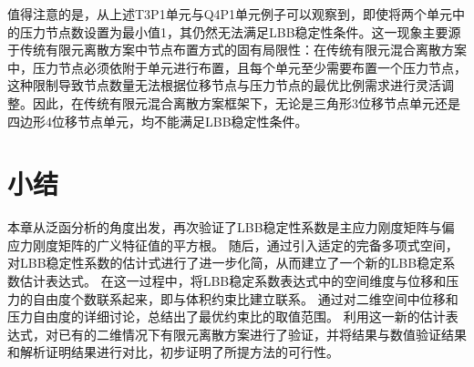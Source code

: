 值得注意的是，从上述T3P1单元与Q4P1单元例子可以观察到，即使将两个单元中的压力节点数设置为最小值1，其仍然无法满足LBB稳定性条件。这一现象主要源于传统有限元离散方案中节点布置方式的固有局限性：在传统有限元混合离散方案中，压力节点必须依附于单元进行布置，且每个单元至少需要布置一个压力节点，这种限制导致节点数量无法根据位移节点与压力节点的最优比例需求进行灵活调整。因此，在传统有限元混合离散方案框架下，无论是三角形3位移节点单元还是四边形4位移节点单元，均不能满足LBB稳定性条件。

\section{小结}
本章从泛函分析的角度出发，再次验证了LBB稳定性系数是主应力刚度矩阵与偏应力刚度矩阵的广义特征值的平方根。
随后，通过引入适定的完备多项式空间，对LBB稳定性系数的估计式进行了进一步化简，从而建立了一个新的LBB稳定系数估计表达式。
在这一过程中，将LBB稳定系数表达式中的空间维度与位移和压力的自由度个数联系起来，即与体积约束比建立联系。
通过对二维空间中位移和压力自由度的详细讨论，总结出了最优约束比的取值范围。
利用这一新的估计表达式，对已有的二维情况下有限元离散方案进行了验证，并将结果与数值验证结果和解析证明结果进行对比，初步证明了所提方法的可行性。
